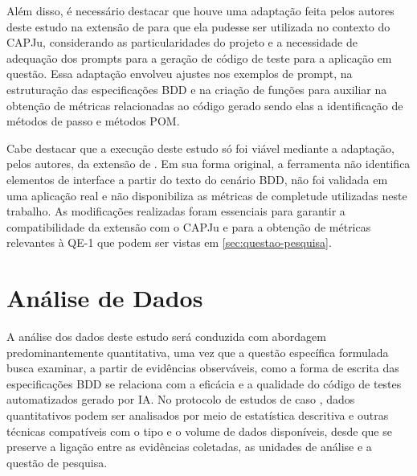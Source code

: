 Além disso, é necessário destacar que houve uma adaptação feita pelos autores deste estudo na extensão de  para que ela pudesse ser utilizada no contexto do CAPJu, considerando as particularidades do projeto e a necessidade de adequação dos prompts para a geração de código de teste para a aplicação em questão. Essa adaptação envolveu ajustes nos exemplos de prompt, na estruturação das especificações BDD e na criação de funções para auxiliar na obtenção de métricas relacionadas ao código gerado sendo elas a identificação de métodos de passo e métodos POM.

Cabe destacar que a execução deste estudo só foi viável mediante a adaptação, pelos autores, da extensão de . Em sua forma original, a ferramenta não identifica elementos de interface a partir do texto do cenário BDD, não foi validada em uma aplicação real e não disponibiliza as métricas de completude utilizadas neste trabalho. As modificações realizadas foram essenciais para garantir a compatibilidade da extensão com o CAPJu e para a obtenção de métricas relevantes à QE-1 que podem ser vistas em \ref{sec:questao-pesquisa}.



\section{Análise de Dados}
\label{sec:analise_dados}

A análise dos dados deste estudo será conduzida com abordagem predominantemente quantitativa, uma vez que a questão específica formulada busca examinar, a partir de evidências observáveis, como a forma de escrita das especificações BDD se relaciona com a eficácia e a qualidade do código de testes automatizados gerado por IA. No protocolo de estudos de caso \cite{Wohlin:2012:ESE:2349018,runeson_case_study_2012}, dados quantitativos podem ser analisados por meio de estatística descritiva e outras técnicas compatíveis com o tipo e o volume de dados disponíveis, desde que se preserve a ligação entre as evidências coletadas, as unidades de análise e a questão de pesquisa.


